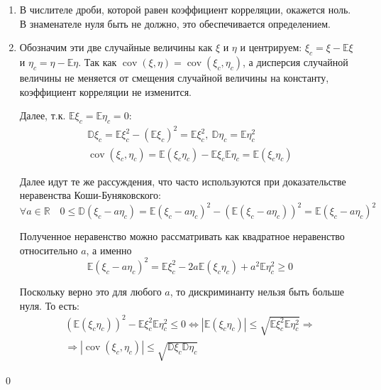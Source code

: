 \documentclass[oneside,final,14pt]{extreport}
\renewenvironment{proof}{{\bfseries Доказательство.}}{\qed}
\theoremstyle{plain}
\theoremstyle{definition}
\theoremstyle{named}
\begin{document}
\begin{proof}
    \begin{enumerate}
    \item В числителе дроби, которой равен коэффициент корреляции,
окажется ноль. В знаменателе нуля быть не должно, это обеспечивается определением.

    \item  Обозначим эти две случайные величины как $\xi$ и $\eta$ и центрируем: $\xi_c = \xi - \mathbb{E}\xi$ и $\eta_c = \eta - \mathbb{E}\eta$. Так как $\operatorname{cov}(\xi, \eta)=\operatorname{cov}\left(\xi_{c}, \eta_{c}\right)$, а дисперсия случайной величины не меняется от смещения случайной величины на константу, коэффициент корреляции не изменится.
    
    Далее, т.к. $\mathbb{E} \xi_{c}=\mathbb{E} \eta_{c}=0$:
    \begin{gather*}
        \mathbb{D} \xi_{c}=\mathbb{E} \xi_{c}^{2}-\left(\mathbb{E} \xi_{c}\right)^{2}=\mathbb{E} \xi_{c}^{2},~ \mathbb{D} \eta_{c}=\mathbb{E} \eta_{c}^{2} \\
        \operatorname{cov}\left(\xi_{c}, \eta_{c}\right)=\mathbb{E}\left(\xi_{c} \eta_{c}\right)-\mathbb{E} \xi_{c} \mathbb{E} \eta_{c}=\mathbb{E}\left(\xi_{c} \eta_{c}\right)
    \end{gather*}
    
    Далее идут те же рассуждения, что часто используются при доказательстве неравенства Коши-Буняковского:
    \begin{equation*}
        \forall a \in \mathbb{R} \quad 0 \leqslant \mathbb{D}\left(\xi_{c}-a \eta_{c}\right)=\mathbb{E}\left(\xi_{c}-a \eta_{c}\right)^{2}-\left(\mathbb{E}\left(\xi_{c}-a \eta_{c}\right)\right)^{2}=\mathbb{E}\left(\xi_{c}-a \eta_{c}\right)^{2}
    \end{equation*}
    
    Полученное неравенство можно рассматривать как квадратное неравенство относительно $a$, а именно
    \begin{equation*}
        \mathbb{E}\left(\xi_{c}-a \eta_{c}\right)^{2}=\mathbb{E} \xi_{c}^{2}-2 a \mathbb{E}\left(\xi_{c} \eta_{c}\right)+a^{2} \mathbb{E} \eta_{c}^{2} \geqslant 0
    \end{equation*}
    
    Поскольку верно это для любого $a$, то дискриминанту нельзя быть больше нуля. То есть:
    \begin{multline*}
        \left(\mathbb{E}\left(\xi_{c} \eta_{c}\right)\right)^{2}-\mathbb{E} \xi_{c}^{2} \mathbb{E} \eta_{c}^{2} \leqslant 0 \Longleftrightarrow\left|\mathbb{E}\left(\xi_{c} \eta_{c}\right)\right| \leqslant \sqrt{\mathbb{E} \xi_{c}^{2} \mathbb{E} \eta_{c}^{2}} \Rightarrow \\
        \Rightarrow\left|\operatorname{cov}\left(\xi_{c}, \eta_{c}\right)\right| \leqslant \sqrt{\mathbb{D} \xi_{c} \mathbb{D} \eta_{c}}
    \end{multline*}
    

\end{enumerate}
\end{proof}
\end{document}
